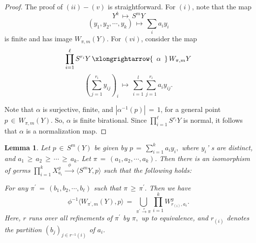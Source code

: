 \documentclass[12pt,reqno]{amsart}
\newtheorem{lemma}{Lemma}[section]
\theoremstyle{definition}
\numberwithin{equation}{section}
\begin{document}
\begin{proof}
The proof of $(ii)-(v)$ is straightforward. For $(i)$, note that the map $$Y^{k}\,\longmapsto\, S^{m}Y $$ 
$$ (y_{1}, y_{2}, \cdots,y_{k})\, \longmapsto\, \sum_{i}a_{i}y_{i} $$ is finite and
has image $ W_{\pi,m}(Y)$. For $(vi)$, consider the map 
    $$ \prod_{i=1}^{\ell} S^{r_{i}}Y\, \xlongrightarrow{\,\,\,\alpha\,\,\,}\, W_{\pi,m}Y $$ 
    $$ ( \sum_{j=1}^{r_{i}}y_{ij})_{i} \,\longmapsto\, \sum_{i=1}^{l}\sum_{j=1}^{r_{i}}a_{i}y_{ij}.$$
    
    Note that $\alpha$ is surjective, finite, and $| \alpha^{-1}(p)|\, =\, 1$, for a general point $ p \,\in\, W_{\pi,m}(Y).$ So, $ \alpha $ is finite birational. Since $\prod_{i=1}^{\ell}S^{r_{i}}Y$ is normal, it follows that $ \alpha$ is a normalization map.

\end{proof}
\begin{lemma}\label{local structure}
    Let $ p\,\in\, S^{m}(Y)$ be given by $ p\,=\, \sum_{i=1}^{k}a_{i}y_{i},$ where $y_{i} $' s are distinct, and $ a_{1}\,\geq\, a_{2}\,\geq\, \cdots\, \geq\, a_{k}.$  Let $ \pi\,=\,(a_{1},a_{2},\cdots,a_{k})$. Then there is an isomorphism of germs 
    $\prod_{i=1}^{k} X_{a_{i}}^g\,\xrightarrow{\,\,\,\phi\,\,\,}\, \langle S^{m}Y, p \rangle$ such that the following holds:
    
    For any $\pi^{\prime}\,=\, (b_{1}, b_{2},\cdots,b_{\ell})$ such that $ \pi\, \geq\, \pi^{\prime}.$ Then we have $$ \phi^{-1}\langle W_{\pi^{\prime},m}(Y), p\rangle\, =\, \bigcup_{\pi^{\prime}\xrightarrow{r} \pi} \prod_{i=1}^{k} W_{r_{(i)},a_{i}}^{g}.$$ Here, $r$ runs over all refinements of $ \pi^{\prime}$ by $\pi,$ up to equivalence, and $r_{(i)}$ denotes the partition $ (b_{j})_{j\in r^{-1}(i)}$ of $a_i.$


\end{lemma}
\end{document}
